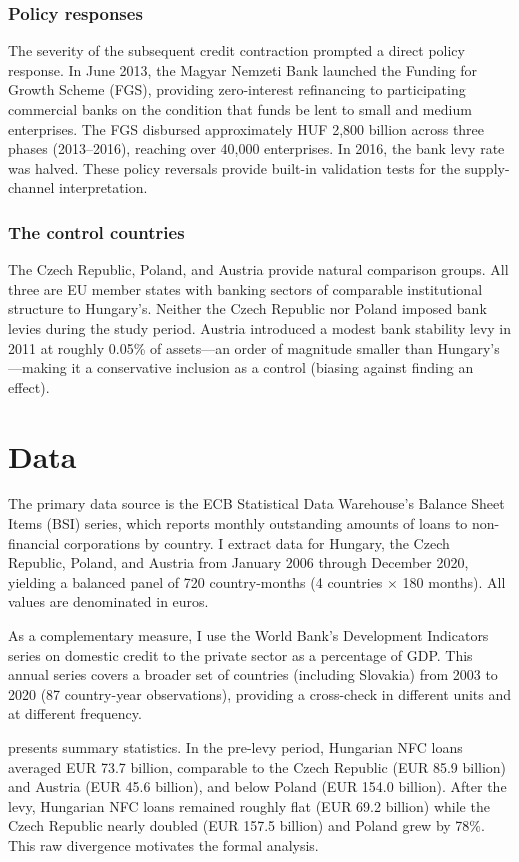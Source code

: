 \documentclass[12pt]{article}
\begin{document}
\subsubsection*{Policy responses} The severity of the subsequent credit contraction prompted a direct policy response. In June 2013, the Magyar Nemzeti Bank launched the Funding for Growth Scheme (FGS), providing zero-interest refinancing to participating commercial banks on the condition that funds be lent to small and medium enterprises. The FGS disbursed approximately HUF 2,800 billion across three phases (2013--2016), reaching over 40,000 enterprises. In 2016, the bank levy rate was halved. These policy reversals provide built-in validation tests for the supply-channel interpretation.

\subsubsection*{The control countries} The Czech Republic, Poland, and Austria provide natural comparison groups. All three are EU member states with banking sectors of comparable institutional structure to Hungary's. Neither the Czech Republic nor Poland imposed bank levies during the study period. Austria introduced a modest bank stability levy in 2011 at roughly 0.05\% of assets---an order of magnitude smaller than Hungary's---making it a conservative inclusion as a control (biasing against finding an effect).


\section{Data}

The primary data source is the ECB Statistical Data Warehouse's Balance Sheet Items (BSI) series, which reports monthly outstanding amounts of loans to non-financial corporations by country. I extract data for Hungary, the Czech Republic, Poland, and Austria from January 2006 through December 2020, yielding a balanced panel of 720 country-months (4 countries $\times$ 180 months). All values are denominated in euros.

As a complementary measure, I use the World Bank's Development Indicators series on domestic credit to the private sector as a percentage of GDP. This annual series covers a broader set of countries (including Slovakia) from 2003 to 2020 (87 country-year observations), providing a cross-check in different units and at different frequency.

 presents summary statistics. In the pre-levy period, Hungarian NFC loans averaged EUR 73.7 billion, comparable to the Czech Republic (EUR 85.9 billion) and Austria (EUR 45.6 billion), and below Poland (EUR 154.0 billion). After the levy, Hungarian NFC loans remained roughly flat (EUR 69.2 billion) while the Czech Republic nearly doubled (EUR 157.5 billion) and Poland grew by 78\%. This raw divergence motivates the formal analysis.
\end{document}
